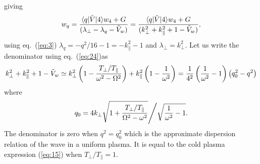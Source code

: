 \documentclass[12pt]{article}
\def\ket#1{|#1\rangle}
\def\bra#1{\langle#1}
\begin{document}
giving
\begin{equation}
  \label{eq:resonance}
  w_q = {\bra{q}|\tilde{V}\ket{4}w_4+G\over (\lambda_\perp-\lambda_q-\tilde{V}_{w})}
  ={\bra{q}|\tilde{V}\ket{4}w_4+G\over
    (k_\perp^2+k_\parallel^2+1-\tilde V_w) },
\end{equation}
using eq.\ (\ref{eq:3}) $\lambda_q=-q^2/16-1=-k_\parallel^2-1$ and
$\lambda_\perp=k_\perp^2$.
Let us write the denominator using eq.\ (\ref{eq:24})as
\begin{equation}
  \label{eq:25}
  k_\perp^2+k_\parallel^2+1-\tilde
  V_w\simeq k_\perp^2\left(1-{T_\perp/T_\parallel\over\omega^2-\Omega^2}\right)
  +k_\parallel^2\left(1-{1\over\omega^2}\right)
= {1\over4^2}\left({1\over\omega^2}-1\right)\left(q_0^2-q^2\right)
\end{equation}
where
\begin{equation}
  \label{eq:26}
  q_0=4k_\perp\sqrt{1+{T_\perp/T_\parallel\over\Omega^2-\omega^2}}
  \Bigg/\sqrt{{1\over\omega^2}-1}.
\end{equation}
The denominator is zero when $q^2=q_0^2$ which is the approximate
dispersion relation of the wave in a uniform plasma. It is equal to the cold
plasma expression (\ref{eq:15}) when $T_\perp/T_\parallel=1$.
\end{document}
